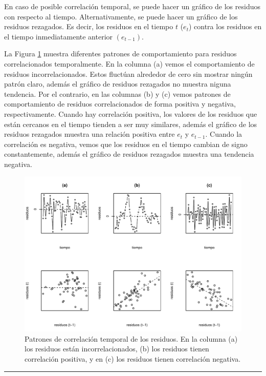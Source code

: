 \documentclass[
]{article}
\begin{document}
En caso de posible correlación temporal, se puede hacer un gráfico de los residuos con respecto al tiempo. Alternativamente, se puede hacer un gráfico de los residuos rezagados. Es decir, los residuos en el tiempo \(t\) (\(e_{t}\)) contra los residuos en el tiempo inmediatamente anterior \((e_{t-1})\).

La Figura \ref{fig:residuosCorr} muestra diferentes patrones de comportamiento para residuos correlacionados temporalmente. En la columna (a) vemos el comportamiento de residuos incorrelacionados. Estos fluctúan alrededor de cero sin mostrar ningún patrón claro, además el gráfico de residuos rezagados no muestra niguna tendencia. Por el contrario, en las columnas (b) y (c) vemos patrones de comportamiento de residuos correlacionados de forma positiva y negativa, respectivamente. Cuando hay correlación positiva, los valores de los residuos que están cercanos en el tiempo tienden a ser muy similares, además el gráfico de los residuos rezagados muestra una relación positiva entre \(e_{t}\) y \(e_{t-1}\). Cuando la correlación es negativa, vemos que los residuos en el tiempo cambian de signo constantemente, además el gráfico de residuos rezagados muestra una tendencia negativa.

\begin{figure}

{\centering \includegraphics{MLG1_files/figure-latex/residuosCorr-1} 

}

\caption{Patrones de correlación temporal de los residuos. En la columna (a) los residuos están incorrelacionados, (b) los residuos tienen correlación positiva, y en (c) los residuos tienen correlación negativa.}\label{fig:residuosCorr}
\end{figure}
\rule{\textwidth}{0.4pt}
\end{document}
